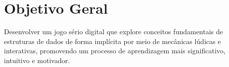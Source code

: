 \section{Objetivo Geral}

Desenvolver um jogo sério \cite{mouaheb2012serious} digital que explore conceitos fundamentais de estruturas de dados de forma implícita por meio de mecânicas lúdicas e interativas, promovendo um processo de aprendizagem mais significativo, intuitivo e motivador.
